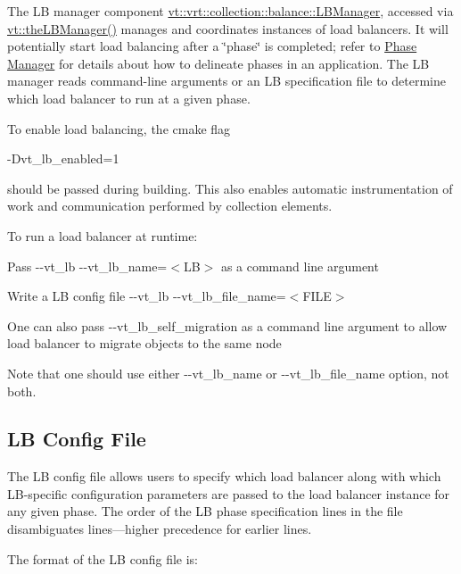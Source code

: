 The LB manager component {\ttfamily \hyperlink{structvt_1_1vrt_1_1collection_1_1balance_1_1_l_b_manager}{vt\+::vrt\+::collection\+::balance\+::\+L\+B\+Manager}}, accessed via {\ttfamily \hyperlink{namespacevt_a05187076eac8c66c9951b062b0955520}{vt\+::the\+L\+B\+Manager()}} manages and coordinates instances of load balancers. It will potentially start load balancing after a \char`\"{}phase\char`\"{} is completed; refer to \hyperlink{phase}{Phase Manager} for details about how to delineate phases in an application. The LB manager reads command-\/line arguments or an LB specification file to determine which load balancer to run at a given phase.

To enable load balancing, the cmake flag
\begin{DoxyCode}
-Dvt\_lb\_enabled=1
\end{DoxyCode}
 should be passed during building. This also enables automatic instrumentation of work and communication performed by collection elements.

To run a load balancer at runtime\+:


\begin{DoxyItemize}
\item Pass {\ttfamily -\/-\/vt\+\_\+lb -\/-\/vt\+\_\+lb\+\_\+name=$<$LB$>$} as a command line argument
\item Write a LB config file {\ttfamily -\/-\/vt\+\_\+lb -\/-\/vt\+\_\+lb\+\_\+file\+\_\+name=$<$F\+I\+LE$>$}
\item One can also pass {\ttfamily -\/-\/vt\+\_\+lb\+\_\+self\+\_\+migration} as a command line argument to allow load balancer to migrate objects to the same node
\end{DoxyItemize}

Note that one should use either {\ttfamily -\/-\/vt\+\_\+lb\+\_\+name} or {\ttfamily -\/-\/vt\+\_\+lb\+\_\+file\+\_\+name} option, not both.\hypertarget{lb-manager_lb-config-file}{}\subsection{L\+B Config File}\label{lb-manager_lb-config-file}
The LB config file allows users to specify which load balancer along with which L\+B-\/specific configuration parameters are passed to the load balancer instance for any given phase. The order of the LB phase specification lines in the file disambiguates lines---higher precedence for earlier lines.

The format of the LB config file is\+:


